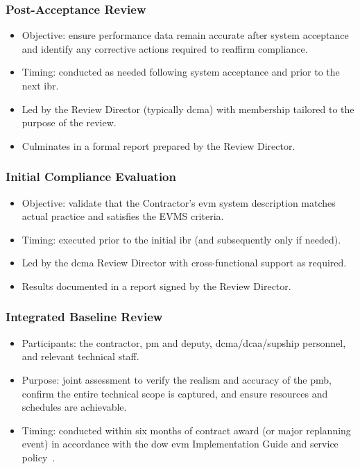 \documentclass[../main.tex]{subfiles}
\begin{document}
\subsubsection{Post-Acceptance Review}
\begin{itemize}
	\item Objective: ensure performance data remain accurate after system acceptance and identify any corrective actions required to reaffirm compliance.
	\item Timing: conducted as needed following system acceptance and prior to the next \ac{ibr}.
	\item Led by the Review Director (typically \ac{dcma}) with membership tailored to the purpose of the review.
	\item Culminates in a formal report prepared by the Review Director.
\end{itemize}
\subsubsection{Initial Compliance Evaluation}
\begin{itemize}
	\item Objective: validate that the Contractor's \ac{evm} system description matches actual practice and satisfies the EVMS criteria.
	\item Timing: executed prior to the initial \ac{ibr} (and subsequently only if needed).
	\item Led by the \ac{dcma} Review Director with cross-functional support as required.
	\item Results documented in a report signed by the Review Director.
\end{itemize}
\subsubsection{Integrated Baseline Review}
\begin{itemize}
	\item Participants: the contractor, \ac{pm} and deputy, \ac{dcma}/\ac{dcaa}/\ac{supship} personnel, and relevant technical staff.
	\item Purpose: joint assessment to verify the realism and accuracy of the \ac{pmb}, confirm the entire technical scope is captured, and ensure resources and schedules are achievable.
	\item Timing: conducted within six months of contract award (or major replanning event) in accordance with the \ac{dow} \ac{evm} Implementation Guide and service policy~\autocite{edo-3-6-1-evm-intro-2025}.
\end{itemize}
\end{document}
